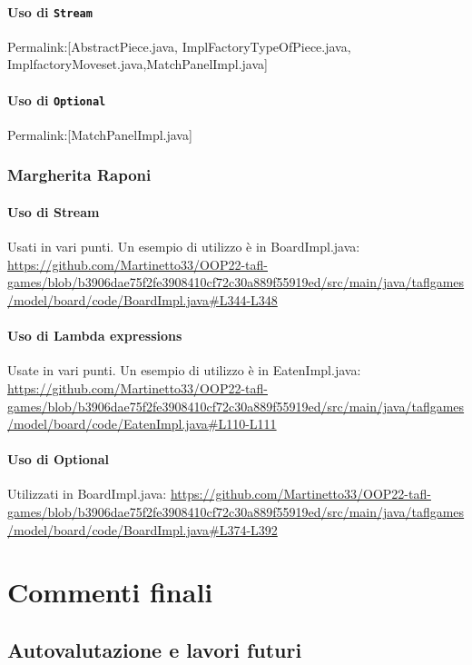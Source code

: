 \documentclass[a4paper,12pt]{report}
\begin{document}
\subsubsection{Uso di \texttt{Stream}}
Permalink:[AbstractPiece.java, ImplFactoryTypeOfPiece.java, ImplfactoryMoveset.java,MatchPanelImpl.java]

\subsubsection{Uso di \texttt{Optional}}
Permalink:[MatchPanelImpl.java]

\subsection{Margherita Raponi}

\subsubsection{Uso di Stream}
Usati in vari punti. Un esempio di utilizzo è in BoardImpl.java: \url{https://github.com/Martinetto33/OOP22-tafl-games/blob/b3906dae75f2fe3908410cf72c30a889f55919ed/src/main/java/taflgames/model/board/code/BoardImpl.java#L344-L348}

\subsubsection{Uso di Lambda expressions}
Usate in vari punti. Un esempio di utilizzo è in EatenImpl.java: \url{https://github.com/Martinetto33/OOP22-tafl-games/blob/b3906dae75f2fe3908410cf72c30a889f55919ed/src/main/java/taflgames/model/board/code/EatenImpl.java#L110-L111}

\subsubsection{Uso di Optional}
Utilizzati in BoardImpl.java: \url{https://github.com/Martinetto33/OOP22-tafl-games/blob/b3906dae75f2fe3908410cf72c30a889f55919ed/src/main/java/taflgames/model/board/code/BoardImpl.java#L374-L392}


\chapter{Commenti finali}


\section{Autovalutazione e lavori futuri}
\end{document}
